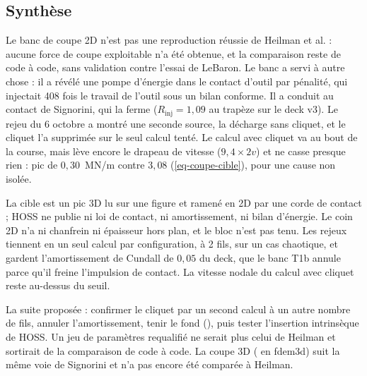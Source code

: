 \subsection{Synthèse}

Le banc de coupe 2D n'est pas une reproduction réussie de Heilman et al. : aucune force de coupe exploitable n'a été obtenue, et la comparaison reste de code à code, sans validation contre l'essai de LeBaron. Le banc a servi à autre chose : il a révélé une pompe d'énergie dans le contact d'outil par pénalité, qui injectait 408 fois le travail de l'outil sous un bilan conforme. Il a conduit au contact de Signorini, qui la ferme ($R_\text{inj} = 1{,}09$ au trapèze sur le deck v3). Le rejeu du 6 octobre a montré une seconde source, la décharge  sans cliquet, et le cliquet l'a supprimée sur le seul calcul tenté. Le calcul avec cliquet va au bout de la course, mais lève encore le drapeau de vitesse ($9{,}4 \times 2v$) et ne casse presque rien : pic de $0{,}30$~MN/m contre $3{,}08$ (\cref{eq-coupe-cible}), pour une cause non isolée.

La cible est un pic 3D lu sur une figure et ramené en 2D par une corde de contact ; HOSS ne publie ni loi de contact, ni amortissement, ni bilan d'énergie. Le coin 2D n'a ni chanfrein ni épaisseur hors plan, et le bloc n'est pas tenu. Les rejeux tiennent en un seul calcul par configuration, à 2 fils, sur un cas chaotique, et gardent l'amortissement de Cundall de $0{,}05$ du deck, que le banc T1b annule parce qu'il freine l'impulsion de contact. La vitesse nodale du calcul avec cliquet reste au-dessus du seuil.

La suite proposée : confirmer le cliquet par un second calcul à un autre nombre de fils, annuler l'amortissement, tenir le fond (), puis tester l'insertion intrinsèque de HOSS. Un jeu de paramètres requalifié ne serait plus celui de Heilman et sortirait de la comparaison de code à code. La coupe 3D ( en fdem3d) suit la même voie de Signorini et n'a pas encore été comparée à Heilman.
